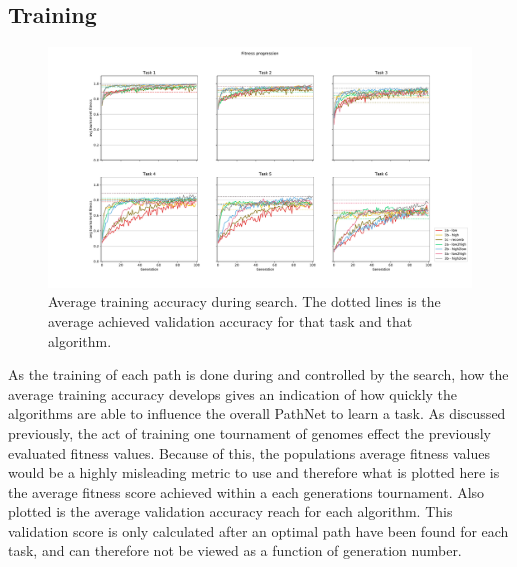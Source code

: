 \subsection{Training}
\begin{figure}[p!]%
    \includegraphics[width=\textwidth]{Chapters/Experiments/search_algo/figures/Training_accuracy.pdf}
    \caption{Average training accuracy during search. The dotted lines is the average achieved validation accuracy for that task and that algorithm.}
    \label{fig:search.accuracy}
\end{figure}
As the training of each path is done during and controlled by the search, how the average training accuracy develops gives an indication of how quickly the algorithms are able to influence the overall PathNet to learn a task. As discussed previously, the act of training one tournament of genomes effect the previously evaluated fitness values. Because of this, the populations average fitness values would be a highly misleading metric to use and therefore what is plotted here is the average fitness score achieved within a each generations tournament. Also plotted is the average validation accuracy reach for each algorithm. This validation score is only calculated after an optimal path have been found for each task, and can therefore not be viewed as a function of generation number. 

